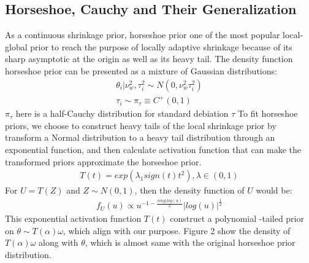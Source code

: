 \subsection{Horseshoe, Cauchy and Their Generalization}
As a continuous shrinkage prior, horseshoe prior one of the most popular local-global prior to reach the purpose of locally adaptive shrinkage because of its sharp asymptotic at the origin as well as its heavy tail. 
The density function horseshoe prior can be presented as a mixture of Gaussian distributions:
\begin{align}
    \theta_i|\nu_w^2,\tau_i^2 \sim  N(0,\nu_w^2\tau_i^2)\\
    \tau_i \sim  \pi_\tau \equiv C^+(0,1)
\end{align}
$\pi_\tau$ here is a half-Cauchy distribution for standard debiation $\tau$
To fit horseshoe priors, we choose to construct heavy tails of the local shrinkage prior by transform a Normal distribution to a heavy tail distribution through an exponential function, and then calculate activation function that can make the transformed priors approximate the horseshoe prior.
\begin{align}
    T(t)=exp(\lambda_1 sign(t)t^2), \lambda \in (0,1)
\end{align}
    For $U=T(Z)$ and $Z\sim N(0,1)$, then the density function of $U$ would be:
    \begin{align}
        f_U(u) \propto u^{-1-\frac{sing(log(u)}{2}}|log(u)|^\frac{1}{2}
    \end{align}
    This exponential activation function $T(t)$ construct a polynomial -tailed prior on $\theta\sim T(\alpha)\omega$, which align with our purpose. Figure 2 show the density of $T(\alpha)\omega$ along with $\theta$, which is almost same with the original horseshoe prior distribution.
